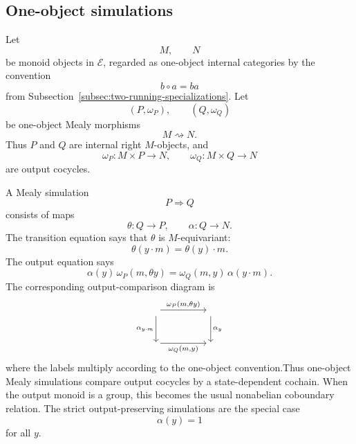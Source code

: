 \subsection{One-object simulations}
\label{subsec:one-object-mealy-simulations}

Let
\[
    M,
    \qquad
    N
\]
be monoid objects in \(\mathcal E\), regarded as one-object internal categories by the convention
\[
    b\circ a=ba
\]
from Subsection~\ref{subsec:two-running-specializations}. Let
\[
    (P,\omega_P),
    \qquad
    (Q,\omega_Q)
\]
be one-object Mealy morphisms
\[
    M\rightsquigarrow N.
\]
Thus \(P\) and \(Q\) are internal right \(M\)-objects, and
\[
    \omega_P:M\times P\to N,
    \qquad
    \omega_Q:M\times Q\to N
\]
are output cocycles.

A Mealy simulation
\[
    P\Rightarrow Q
\]
consists of maps
\[
    \theta:Q\to P,
    \qquad
    \alpha:Q\to N.
\]
The transition equation says that \(\theta\) is \(M\)-equivariant:
\[
    \theta(y\cdot m)=\theta(y)\cdot m.
\]
The output equation says
\[
    \alpha(y)\,\omega_P(m,\theta y)
    =
    \omega_Q(m,y)\,\alpha(y\cdot m).
\]
The corresponding output-comparison diagram is
\[
    \begin{tikzcd}[column sep=huge, row sep=large]
        {}
            \arrow[r, "{\omega_P(m,\theta y)}"]
            \arrow[d, "{\alpha_{y\cdot m}}"']
        &
        {}
            \arrow[d, "{\alpha_y}"]
        \\
        {}
            \arrow[r, "{\omega_Q(m,y)}"']
        &
        {}
    \end{tikzcd}
\]
where the labels multiply according to the one-object convention.Thus one-object Mealy simulations compare output cocycles by a state-dependent cochain. When the output monoid is a group, this becomes the usual nonabelian coboundary relation. The strict output-preserving simulations are the special case
\[
    \alpha(y)=1
\]
for all \(y\).

